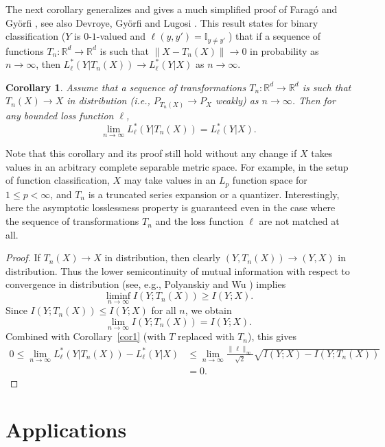\documentclass[11pt]{article}
\newtheorem{cor}{Corollary}
\def\R{{\mathbb R}}
\def\IND{{\mathbb I}}
\begin{document}
The next corollary generalizes and gives a much simplified  proof of 
Farag\'o and Gy\"orfi \cite{FaGy75}, see also Devroye, Gy\"orfi and Lugosi \cite[Theorem.~32.3]{DeGyLu96}.  This result states  for binary classification ($Y$ is $0$-$1$-valued and $\ell(y,y')=\IND_{y\neq y'}\; $) that if a sequence of functions $T_n:\R^d\to \R^d$ is such that $\|X-T_n(X)\|\to 0$ in probability as $n\to \infty$, then $ L_\ell^*(Y|T_n(X))\to  L_\ell^*(Y|X)$ as $n\to \infty$. 

\begin{cor}
\label{cor3}
Assume that a sequence of transformations  $T_n:\R^d\to \R^d$ is such that   $T_n(X)\to  X$ in distribution  (i.e., $P_{T_n(X)} \to P_X$ weakly) as $n\to \infty$. Then for any bounded loss function $\ell$,
\begin{equation}
    \label{eq_approx}
    \lim_{n\to \infty} L_\ell^*(Y|T_n(X))=  L_\ell^*(Y|X).
\end{equation}
\end{cor}

Note that this corollary and its proof still hold  without any change if  $X$ takes values in an arbitrary complete  separable metric space. 
For example, in the setup of function classification, $X$ may take values in an $L_p$ function space for $1\le p<\infty$, and $T_n$ is a truncated series expansion or a quantizer. 
Interestingly, here the asymptotic losslessness property is guaranteed even in the case where the sequence of transformations $T_n$ and the loss function $\ell$ are not matched at all. 

\begin{proof}
If $T_n(X)\to X$ in distribution, then clearly $(Y,T_n(X))\to (Y,X)$ in distribution. Thus the   lower semicontinuity of mutual information with respect to convergence in distribution 
(see, e.g., Polyanskiy and Wu \cite[Eq.~4.28]{PoWu22})  implies 
\[
\liminf_{n\to \infty} I(Y;T_n(X)) \ge I(Y;X).
\]
Since $ I(Y;T_n(X)) \le I(Y;X)$ for all $n$, we obtain 
\[
\lim_{n\to \infty} I(Y;T_n(X)) = I(Y;X).
\]
Combined with Corollary~\ref{cor1} (with $T$ replaced with $T_n$),  this gives 
\begin{align*}
0\le \lim_{n\to \infty} L_\ell^*(Y|T_n(X))  -L_\ell^*(Y|X) & \le 
\lim_{n\to \infty}   \frac{\|\ell\|_{\infty}}{\sqrt{2}} \sqrt{
  I(Y;X)-I(Y;T_n(X))}   \\
&=0.
\end{align*}
\end{proof}


\section{Applications}
\end{document}
